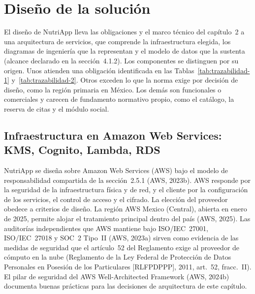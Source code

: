 \documentclass[12pt, a4paper]{article}
\makeatletter
\newcommand{\saltoseccion}{\par
  \ifx\@deferlist\@empty
    \ifdim\pagegoal<\maxdimen
      \ifdim\dimexpr\textheight-\pagegoal+\pagetotal\relax>0.5\textheight\clearpage\fi
    \fi
  \else\clearpage\fi}
\let\seccionbase\section
\renewcommand{\section}{\saltoseccion\seccionbase}
\makeatother
\begin{document}
\section{Diseño de la solución}
 
El diseño de NutriApp lleva las obligaciones y el marco técnico del
capítulo~2 a una arquitectura de servicios, que comprende la
infraestructura elegida, los diagramas de ingeniería que la
representan y el modelo de datos que la sustenta (alcance declarado
en la sección~4.1.2). Los componentes se distinguen por su origen.
Unos atienden una obligación identificada en las
Tablas~\ref{tab:trazabilidad-1} y~\ref{tab:trazabilidad-2}. Otros
exceden lo que la norma exige por decisión de diseño, como la región
primaria en México. Los demás son funcionales o comerciales y carecen
de fundamento normativo propio, como el catálogo, la reserva de citas
y el módulo social.
 
 
\subsection{Infraestructura en Amazon Web Services: KMS, Cognito, Lambda, RDS}

NutriApp se diseña sobre Amazon Web Services (AWS) bajo el modelo de
responsabilidad compartida de la sección~2.5.1 (AWS, 2023b). AWS
responde por la seguridad de la infraestructura
física y de red, y el cliente por la configuración de los servicios,
el control de acceso y el cifrado. La elección
del proveedor obedece a criterios de diseño. La región AWS Mexico
(Central), abierta en enero de 2025, permite alojar el tratamiento
principal dentro del país (AWS, 2025). Las auditorías independientes
que AWS mantiene bajo ISO/IEC~27001, ISO/IEC~27018 y SOC~2 Tipo~II
(AWS, 2023a) sirven como evidencia de las medidas de seguridad que el
artículo~52 del Reglamento exige al proveedor de cómputo en la nube
(Reglamento de la Ley Federal de Protección de Datos Personales en Posesión de los Particulares [RLFPDPPP], 2011, art.~52, fracc.~II). El pilar de seguridad del AWS
Well-Architected Framework (AWS, 2024b) documenta buenas prácticas para las
decisiones de arquitectura de este capítulo.
\end{document}
